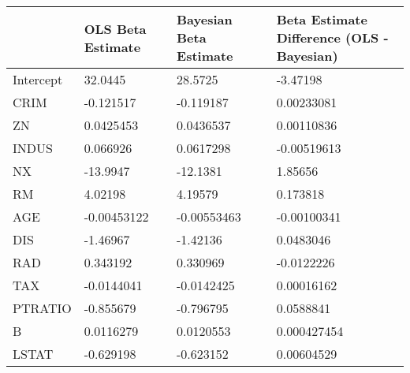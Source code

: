 \begin{tabular}{llll}
\hline
           & OLS Beta Estimate   & Bayesian Beta Estimate   & Beta Estimate Difference (OLS - Bayesian)   \\
\hline
 Intercept & 32.0445             & 28.5725                  & -3.47198                                    \\
 CRIM      & -0.121517           & -0.119187                & 0.00233081                                  \\
 ZN        & 0.0425453           & 0.0436537                & 0.00110836                                  \\
 INDUS     & 0.066926            & 0.0617298                & -0.00519613                                 \\
 NX        & -13.9947            & -12.1381                 & 1.85656                                     \\
 RM        & 4.02198             & 4.19579                  & 0.173818                                    \\
 AGE       & -0.00453122         & -0.00553463              & -0.00100341                                 \\
 DIS       & -1.46967            & -1.42136                 & 0.0483046                                   \\
 RAD       & 0.343192            & 0.330969                 & -0.0122226                                  \\
 TAX       & -0.0144041          & -0.0142425               & 0.00016162                                  \\
 PTRATIO   & -0.855679           & -0.796795                & 0.0588841                                   \\
 B         & 0.0116279           & 0.0120553                & 0.000427454                                 \\
 LSTAT     & -0.629198           & -0.623152                & 0.00604529                                  \\
\hline
\end{tabular}